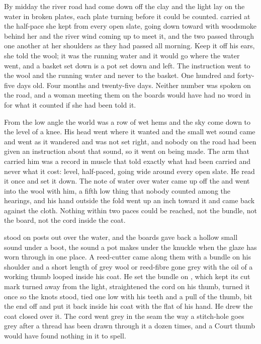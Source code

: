 By midday the river road had come down off the clay and the light lay on the water in broken plates, each plate turning before it could be counted.  carried  at the half-pace she kept from every open slate, going down toward  with woodsmoke behind her and the river wind coming up to meet it, and the two passed through one another at her shoulders as they had passed all morning. Keep it off his ears, she told the wool; it was the running water and it would go where the water went, and a basket set down is a pot set down and left. The instruction went to the wool and the running water and never to the basket. One hundred and forty-five days old. Four months and twenty-five days. Neither number was spoken on the road, and a woman meeting them on the boards would have had no word in  for what it counted if she had been told it.

From the low angle the world was a row of wet hems and the sky come down to the level of a knee. His head went where it wanted and the small wet sound came and went as it wandered and was not set right, and nobody on the road had been given an instruction about that sound, so it went on being made. The arm that carried him was a record in muscle that told exactly what had been carried and never what it cost: level, half-paced, going wide around every open slate. He read it once and set it down. The note of water over water came up off the  and went into the wool with him, a fifth low thing that nobody counted among the hearings, and his hand outside the fold went up an inch toward it and came back against the cloth. Nothing within two paces could be reached, not the bundle, not the board, not the cord inside the coat.

 stood on posts out over the water, and the boards gave back a hollow small sound under a boot, the sound a pot makes under the knuckle when the glaze has worn through in one place. A reed-cutter came along them with a bundle on his shoulder and a short length of grey wool or reed-fibre gone grey with the oil of a working thumb looped inside his coat. He set the bundle on , which kept its cut mark turned away from the light, straightened the cord on his thumb, turned it once so the knots stood, tied one low with his teeth and a pull of the thumb, bit the end off and put it back inside his coat with the flat of his hand. He drew the coat closed over it. The cord went grey in the seam the way a stitch-hole goes grey after a thread has been drawn through it a dozen times, and a Court thumb would have found nothing in it to spell.


